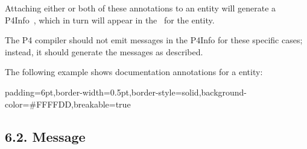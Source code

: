 \documentclass[11pt]{article}
\begin{document}
{%
\noindent{}Attaching either or both of these annotations to an entity will generate a
P4Info~, which in turn will
appear in the~ for the entity.%

The P4 compiler should not emit  messages in the P4Info for these
specific cases; instead, it should generate the  messages as
described.%

The following example shows documentation annotations for a  entity:%

\begin{mdbmargintb}{6pt}{6pt}%
\begin{mdblock}{padding=6pt,border-width=0.5pt,border-style=solid,background-color=\#FFFFDD,breakable=true}%
\begin{mdpre}%
\end{mdpre}%
\end{mdblock}%
\end{mdbmargintb}%

\subsection{6.2.\hspace*{0.5em} Message}\label{sec-pkginfo-message}%

}
\end{document}
